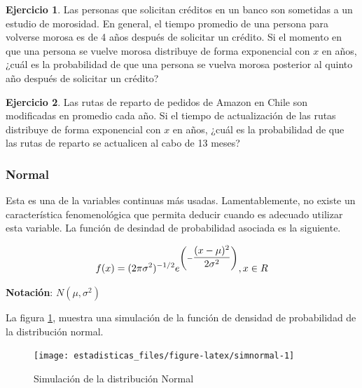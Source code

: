 \documentclass[
  11pt,
]{book}
\theoremstyle{definition}
\theoremstyle{definition}
\theoremstyle{definition}
\newtheorem{exercise}{Ejercicio}[chapter]
\theoremstyle{definition}
\theoremstyle{remark}
\begin{document}
\begin{exercise}
Las personas que solicitan créditos en un banco son sometidas a un estudio de morosidad. En general, el tiempo promedio de una persona para volverse morosa es de 4 años después de solicitar un crédito. Si el momento en que una persona se vuelve morosa distribuye de forma exponencial con \(x\) en años, ¿cuál es la probabilidad de que una persona se vuelva morosa posterior al quinto año después de solicitar un crédito?
\end{exercise}

\begin{exercise}
Las rutas de reparto de pedidos de Amazon en Chile son modificadas en promedio cada año. Si el tiempo de actualización de las rutas distribuye de forma exponencial con \(x\) en años, ¿cuál es la probabilidad de que las rutas de reparto se actualicen al cabo de 13 meses?
\end{exercise}

\subsubsection{Normal}\label{normal}

Esta es una de la variables continuas más usadas. Lamentablemente, no existe un característica fenomenológica que permita deducir cuando es adecuado utilizar esta variable. La función de desindad de probabilidad asociada es la siguiente.

\begin{equation}
\notag
f(x)= (2\pi \sigma^2)^{-1/2}e^{\left( -\displaystyle\frac{(x-\mu)^2}{2\sigma^2} \right)} ,x \in R
\end{equation}

\textbf{Notación}: \(N(\mu, \sigma^2)\)

La figura \ref{fig:simnormal}, muestra una simulación de la función de densidad de probabilidad de la distribución normal.

\begin{figure}

{\centering \texttt{[image: estadisticas\_files/figure-latex/simnormal-1]} 

}

\caption{Simulación de la distribución Normal}\label{fig:simnormal}
\end{figure}
\end{document}
